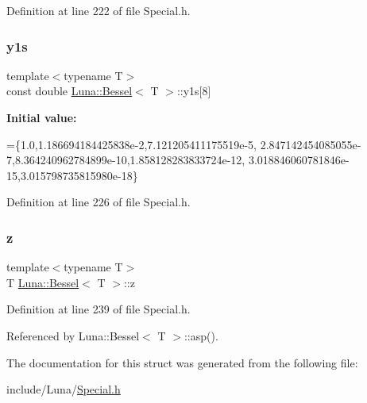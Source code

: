Definition at line 222 of file Special.\+h.

\mbox{\label{structLuna_1_1Bessel_ac2eeeedc9437d9a3b78cd9e30ba2aa37}} 
\subsubsection{\texorpdfstring{y1s}{y1s}}
{\footnotesize\ttfamily template$<$typename T$>$ \\
const double \hyperlink{structLuna_1_1Bessel}{Luna\+::\+Bessel}$<$ T $>$\+::y1s\mbox{[}8\mbox{]}}

{\bfseries Initial value\+:}
\begin{DoxyCode}
=\{1.0,1.186694184425838e-2,7.121205411175519e-5,
        2.847142454085055e-7,8.364240962784899e-10,1.858128283833724e-12,
        3.018846060781846e-15,3.015798735815980e-18\}
\end{DoxyCode}


Definition at line 226 of file Special.\+h.

\mbox{\label{structLuna_1_1Bessel_a3ffa857b03c181b3e3ba7422124c60e1}} 
\subsubsection{\texorpdfstring{z}{z}}
{\footnotesize\ttfamily template$<$typename T$>$ \\
T \hyperlink{structLuna_1_1Bessel}{Luna\+::\+Bessel}$<$ T $>$\+::z}



Definition at line 239 of file Special.\+h.



Referenced by Luna\+::\+Bessel$<$ T $>$\+::asp().



The documentation for this struct was generated from the following file\+:\begin{DoxyCompactItemize}
\item 
include/\+Luna/\hyperlink{Special_8h}{Special.\+h}\end{DoxyCompactItemize}
